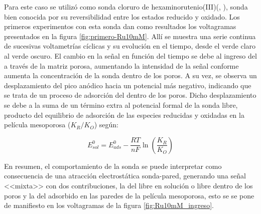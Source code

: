 		Para este caso se utilizó como sonda cloruro de hexaminorutenio(III)\linebreak (\aminorutenioCompleto, \ru), sonda bien conocida por su reversibilidad entre los estados reducido y oxidado. Los primeros experimentos con esta sonda dan como resultados los voltagramas presentados en la figura \ref{fig:primero-Ru10mM}. Allí se muestra una serie continua de sucesivas voltametrías cíclicas y su evolución en el tiempo, desde el verde claro al verde oscuro. El cambio en la señal en función del tiempo se debe al ingreso del \ru\space a través de la matriz porosa, aumentando la intensidad de la señal conforme aumenta la concentración de la sonda dentro de los poros. A su vez, se observa un desplazamiento del pico anódico hacia un potencial más negativo, indicando que se trata de un proceso de adsorción del \ru\space dentro de los poros. Dicho desplazamiento se debe a la suma de un término extra al potencial formal de la sonda libre, producto del equilibrio de adsorción de las especies reducidas y oxidadas en la película mesoporosa ($K_R/K_O$) según\cite{Wi2000}: 

				\begin{equation}
				E^0_{sol} = E^0_{ads}-\frac{RT}{nF}\ln \left(\frac{K_R}{K_O}\right)
				\end{equation}

		En resumen, el comportamiento de la sonda se puede interpretar como consecuencia de una atracción electrostática sonda-pared, generando una señal <<mixta>> con dos contribuciones, la del \ru\space libre en solución o libre dentro de los poros y la del adsorbido en las paredes de la película mesoporosa, esto se se pone de manifiesto en los voltagramas de la figura \ref{fig:Ru10mM_ingreso}.

